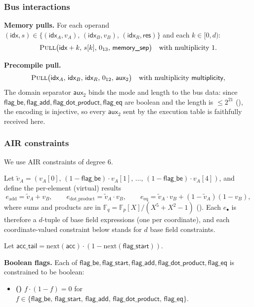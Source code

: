 \documentclass{article}
\theoremstyle{definition}
\newcommand{\Fp}{\mathbb F_p}
\newcommand{\Fq}{\mathbb F_q}
\newcommand{\extdeg}{d} %
\begin{document}
\subsubsection{Bus interactions}

\textbf{Memory pulls.} For each operand $(\textsf{idx}, s) \in \{(\textsf{idx}_A, v_A),\, (\textsf{idx}_B, v_B),\, (\textsf{idx}_R, \textsf{res})\}$ and each $k \in [0, \extdeg)$:
\[
\textsc{Pull}\big(\textsf{idx} + k,\, s[k],\, 0_{13},\, \textsf{memory\_sep}\big) \quad \text{with multiplicity } 1.
\]

\textbf{Precompile pull.}
\[
\textsc{Pull}\big(\textsf{idx}_A,\, \textsf{idx}_B,\, \textsf{idx}_R,\, 0_{12},\, \textsf{aux}_2\big) \quad \text{with multiplicity } \textsf{multiplicity},
\]
The domain separator $\textsf{aux}_2$ binds the mode and length to the bus data: since $\textsf{flag\_be}, \textsf{flag\_add}, \textsf{flag\_dot\_product}, \textsf{flag\_eq}$ are boolean and the length is $\leq 2^{21}$ (), the encoding is injective, so every $\textsf{aux}_2$ sent by the execution table is faithfully received here.


\subsubsection{AIR constraints}

We use AIR constraints of degree 6.

\vspace{2mm}

Let $\tilde v_A = (v_A[0],\, (1 - \textsf{flag\_be}) \cdot v_A[1],\, \dots,\, (1 - \textsf{flag\_be}) \cdot v_A[4])$, and define the per-element (virtual) results
\[
    e_\text{add} = \tilde v_A + v_B, \qquad e_\text{dot\_product} = \tilde v_A \cdot v_B, \qquad e_\text{eq} = \tilde v_A \cdot v_B + (1 - \tilde v_A)(1 - v_B),
\]
where sums and products are in $\Fq = \Fp[X]/(X^5 + X^2 - 1)$ (). Each $e_\bullet$ is therefore a $\extdeg$-tuple of base field expressions (one per coordinate), and each coordinate-valued constraint below stands for $\extdeg$ base field constraints.

Let $\textsf{acc\_tail} = \text{next}(\textsf{acc}) \cdot (1 - \text{next}(\textsf{flag\_start}))$.

\vspace{2mm}

\textbf{Boolean flags.} Each of $\textsf{flag\_be}, \textsf{flag\_start}, \textsf{flag\_add}, \textsf{flag\_dot\_product}, \textsf{flag\_eq}$ is constrained to be boolean:
\begin{itemize}
    \item {}\textbf{(\theequation)}\label{c:bool-flags}\hspace{1mm} $f \cdot (1 - f) = 0$ for $f \in \{\textsf{flag\_be},\, \textsf{flag\_start},\, \textsf{flag\_add},\, \textsf{flag\_dot\_product},\, \textsf{flag\_eq}\}$.
\end{itemize}
\end{document}
